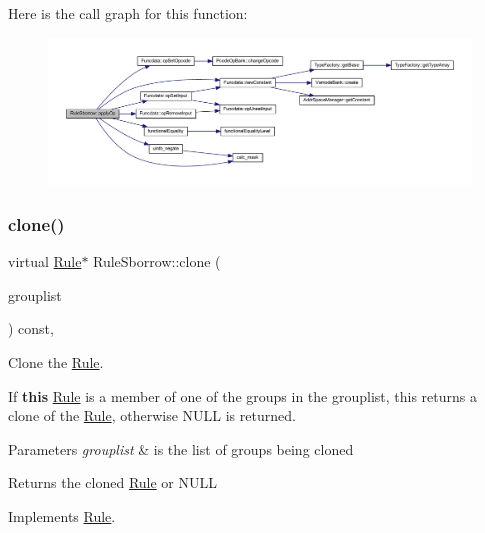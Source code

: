 Here is the call graph for this function\+:
\nopagebreak
\begin{figure}[H]
\begin{center}
\leavevmode
\includegraphics[width=350pt]{class_rule_sborrow_a624c5e919a23a5fd208c810aef997c48_cgraph}
\end{center}
\end{figure}
\mbox{\label{class_rule_sborrow_a25117849635c9e96434c3a054129d18b}} 
\subsubsection{\texorpdfstring{clone()}{clone()}}
{\footnotesize\ttfamily virtual \mbox{\hyperlink{class_rule}{Rule}}$\ast$ Rule\+Sborrow\+::clone (\begin{DoxyParamCaption}\item[{const \mbox{\hyperlink{class_action_group_list}{Action\+Group\+List}} \&}]{grouplist }\end{DoxyParamCaption}) const\hspace{0.3cm}{\ttfamily [inline]}, {\ttfamily [virtual]}}



Clone the \mbox{\hyperlink{class_rule}{Rule}}. 

If {\bfseries{this}} \mbox{\hyperlink{class_rule}{Rule}} is a member of one of the groups in the grouplist, this returns a clone of the \mbox{\hyperlink{class_rule}{Rule}}, otherwise N\+U\+LL is returned. 
\begin{DoxyParams}{Parameters}
{\em grouplist} & is the list of groups being cloned \\
\hline
\end{DoxyParams}
\begin{DoxyReturn}{Returns}
the cloned \mbox{\hyperlink{class_rule}{Rule}} or N\+U\+LL 
\end{DoxyReturn}


Implements \mbox{\hyperlink{class_rule_a70de90a76461bfa7ea0b575ce3c11e4d}{Rule}}.



